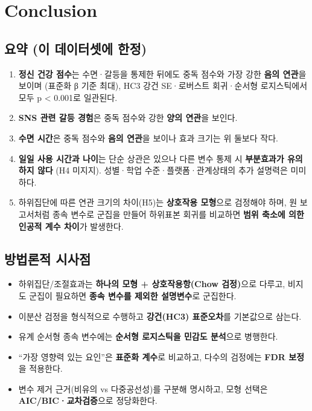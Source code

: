 \documentclass[11pt]{article}
\providecommand{\tightlist}{%
      \setlength{\itemsep}{0pt}\setlength{\parskip}{0pt}}
\begin{document}
\hypertarget{conclusion}{%
\section{Conclusion}\label{conclusion}}

\hypertarget{uxc694uxc57d-uxc774-uxb370uxc774uxd130uxc14buxc5d0-uxd55cuxc815}{%
\subsection{요약 (이 데이터셋에
한정)}\label{uxc694uxc57d-uxc774-uxb370uxc774uxd130uxc14buxc5d0-uxd55cuxc815}}

\begin{enumerate}
\def\labelenumi{\arabic{enumi}.}
\tightlist
\item
  \textbf{정신 건강 점수}는 수면·갈등을 통제한 뒤에도 중독 점수와 가장
  강한 \textbf{음의 연관}을 보이며 (표준화 β 기준 최대), HC3 강건
  SE·로버스트 회귀·순서형 로지스틱에서 모두 p \textless{} 0.001로
  일관된다.
\item
  \textbf{SNS 관련 갈등 경험}은 중독 점수와 강한 \textbf{양의 연관}을
  보인다.
\item
  \textbf{수면 시간}은 중독 점수와 \textbf{음의 연관}을 보이나 효과
  크기는 위 둘보다 작다.
\item
  \textbf{일일 사용 시간과 나이}는 단순 상관은 있으나 다른 변수 통제 시
  \textbf{부분효과가 유의하지 않다} (H4 미지지). 성별·학업
  수준·플랫폼·관계상태의 추가 설명력은 미미하다.
\item
  하위집단에 따른 연관 크기의 차이(H5)는 \textbf{상호작용 모형}으로
  검정해야 하며, 원 보고서처럼 종속 변수로 군집을 만들어 하위표본 회귀를
  비교하면 \textbf{범위 축소에 의한 인공적 계수 차이}가 발생한다.
\end{enumerate}

\hypertarget{uxbc29uxbc95uxb860uxc801-uxc2dcuxc0acuxc810}{%
\subsection{방법론적
시사점}\label{uxbc29uxbc95uxb860uxc801-uxc2dcuxc0acuxc810}}

\begin{itemize}
\tightlist
\item
  하위집단/조절효과는 \textbf{하나의 모형 + 상호작용항(Chow 검정)}으로
  다루고, 비지도 군집이 필요하면 \textbf{종속 변수를 제외한 설명변수}로
  군집한다.
\item
  이분산 검정을 형식적으로 수행하고 \textbf{강건(HC3) 표준오차}를
  기본값으로 삼는다.
\item
  유계 순서형 종속 변수에는 \textbf{순서형 로지스틱을 민감도 분석}으로
  병행한다.
\item
  ``가장 영향력 있는 요인''은 \textbf{표준화 계수}로 비교하고, 다수의
  검정에는 \textbf{FDR 보정}을 적용한다.
\item
  변수 제거 근거(비유의 vs 다중공선성)를 구분해 명시하고, 모형 선택은
  \textbf{AIC/BIC·교차검증}으로 정당화한다.
\end{itemize}


    
    
    
\end{document}
